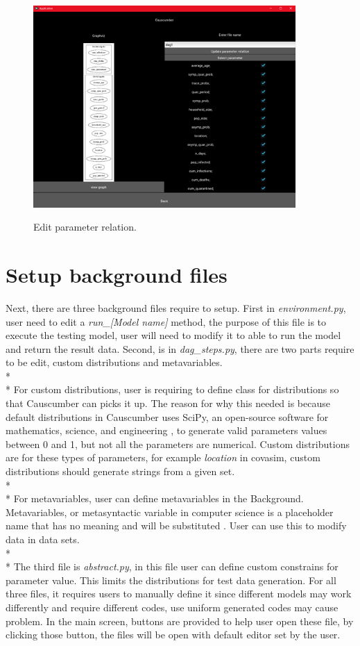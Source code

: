 \begin{figure}[H]
	\centering
	\includegraphics[width=10cm]{figures/editDot2Screen.png}\\
	\caption{Edit parameter relation.}
	\label{fig:figure15}
\end{figure}

\section{Setup background files}
Next, there are three background files require to setup. First in \textsl{environment.py}, user need to edit a \textsl{run\_[Model name]} method, the purpose of this file is to execute the testing model, user will need to modify it to able to run the model and return the result data. Second, is in \textsl{dag\_steps.py}, there are two parts require to be edit, custom distributions and metavariables. \\*\\*
For custom distributions, user is requiring to define class for distributions so that Causcumber can picks it up. The reason for why this needed is because default distributions in Causcumber uses SciPy, an open-source software for mathematics, science, and engineering \cite{Reference22}, to generate valid parameters values between 0 and 1, but not all the parameters are numerical. Custom distributions are for these types of parameters, for example \textsl{location} in covasim, custom distributions should generate strings from a given set.\\*\\*
For metavariables, user can define metavariables in the Background. Metavariables, or metasyntactic variable in computer science is a placeholder name that has no meaning and will be substituted \cite{Reference23}. User can use this to modify data in data sets.\\*\\*
The third file is \textsl{abstract.py}, in this file user can define custom constrains for parameter value. This limits the distributions for test data generation. For all three files, it requires users to manually define it since different models may work differently and require different codes, use uniform generated codes may cause problem. In the main screen, buttons are provided to help user open these file, by clicking those button, the files will be open with default editor set by the user.

